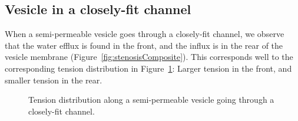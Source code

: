 \documentclass[9pt,twocolumn,twoside,lineno]{pnas-new}
\begin{document}
\subsection*{Vesicle in a closely-fit channel}
When a semi-permeable vesicle goes through a closely-fit channel, we observe that the water efflux is found in the front, and the influx is in the rear of the vesicle membrane (Figure~\ref{fig:stenosisComposite}). This corresponds well to the corresponding tension distribution in Figure~\ref{fig:stenosisTensions}: Larger tension in the front, and smaller tension in the rear.
\begin{figure}[htp]
  \centering
  \caption{\label{fig:stenosisTensions} Tension distribution along a semi-permeable vesicle going through a closely-fit channel.}
\end{figure}
\end{document}
